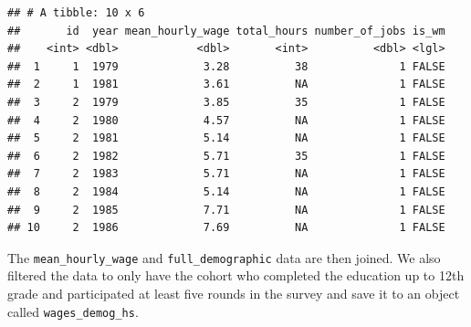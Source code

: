 \documentclass{article}
\newenvironment{Shaded}{\begin{snugshade}}{\end{snugshade}}
\newcommand{\CommentTok}[1]{\textcolor[rgb]{0.56,0.35,0.01}{\textit{#1}}}
\newcommand{\DataTypeTok}[1]{\textcolor[rgb]{0.13,0.29,0.53}{#1}}
\newcommand{\DecValTok}[1]{\textcolor[rgb]{0.00,0.00,0.81}{#1}}
\newcommand{\KeywordTok}[1]{\textcolor[rgb]{0.13,0.29,0.53}{\textbf{#1}}}
\newcommand{\NormalTok}[1]{#1}
\newcommand{\OperatorTok}[1]{\textcolor[rgb]{0.81,0.36,0.00}{\textbf{#1}}}
\newcommand{\StringTok}[1]{\textcolor[rgb]{0.31,0.60,0.02}{#1}}
\begin{document}
\begin{verbatim}
## # A tibble: 10 x 6
##       id  year mean_hourly_wage total_hours number_of_jobs is_wm
##    <int> <dbl>            <dbl>       <int>          <dbl> <lgl>
##  1     1  1979             3.28          38              1 FALSE
##  2     1  1981             3.61          NA              1 FALSE
##  3     2  1979             3.85          35              1 FALSE
##  4     2  1980             4.57          NA              1 FALSE
##  5     2  1981             5.14          NA              1 FALSE
##  6     2  1982             5.71          35              1 FALSE
##  7     2  1983             5.71          NA              1 FALSE
##  8     2  1984             5.14          NA              1 FALSE
##  9     2  1985             7.71          NA              1 FALSE
## 10     2  1986             7.69          NA              1 FALSE
\end{verbatim}

The \texttt{mean\_hourly\_wage} and \texttt{full\_demographic} data are
then joined. We also filtered the data to only have the cohort who
completed the education up to 12th grade and participated at least five
rounds in the survey and save it to an object called
\texttt{wages\_demog\_hs}.

\begin{Shaded}
\end{Shaded}
\end{document}
